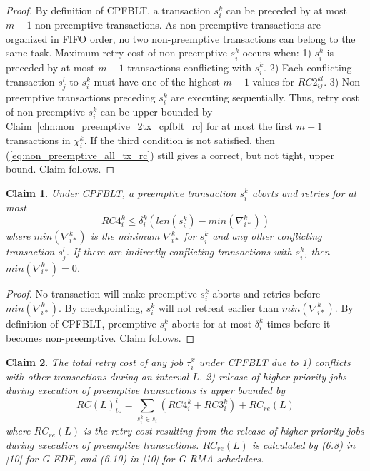 \documentclass[conference]{IEEEtran}
\newtheorem{clm}{Claim}
\begin{document}
%
\begin{proof}
By definition of CPFBLT, a transaction $s_i^k$ can be preceded by at most $m-1$ non-preemptive transactions. As non-preemptive transactions are organized in FIFO order, no two non-preemptive transactions can belong to the same task. Maximum retry cost of non-preemptive $s_i^k$ occurs when: 1) $s_i^k$ is preceded by at most $m-1$ transactions conflicting with $s_i^k$. 2) Each conflicting transaction $s_j^l$ to $s_i^k$ must have one of the highest $m-1$ values for $RC2_{ij}^{kl}$. 3) Non-preemptive transactions preceding $s_i^k$ are executing sequentially. Thus, retry cost of non-preemptive $s_i^k$ can be upper bounded by Claim~\ref{clm:non_preemptive_2tx_cpfblt_rc} for at most the first $m-1$ transactions in $\chi_i^k$. If the third condition is not satisfied, then (\ref{eq:non_preemptive_all_tx_rc}) still gives a correct, but not tight, upper bound. Claim follows.
\end{proof}
%
\begin{clm}\label{clm:delta_ik_rc}
%
Under CPFBLT, a preemptive transaction $s_i^k$ aborts and retries for at most
\begin{equation}
RC4_i^k \le \delta_i^k \left(len\left(s_i^k\right)-min\left(\nabla_{i*}^k\right)\right)
\label{eq:delta_ik_rc}
\end{equation}
%
where $min\left(\nabla_{i*}^k\right)$ is the minimum $\nabla_{i*}^k$ for $s_i^k$ and any other conflicting transaction $s_j^l$. If there are indirectly conflicting transactions with $s_i^k$, then $min\left(\nabla_{i*}^k\right)=0$.
%
\end{clm}
%
\begin{proof}
%
No transaction will make preemptive $s_i^k$ aborts and retries before $min\left(\nabla_{i*}^k\right)$. By checkpointing, $s_i^k$ will not retreat earlier than $min\left(\nabla_{i*}^k\right)$. By definition of CPFBLT, preemptive $s_i^k$ aborts for at most $\delta_i^k$ times before it becomes non-preemptive. Claim follows.
\end{proof}
%
\begin{clm}\label{clm:closed_nested_fblt_final}
%
The total retry cost of any job $\tau_i^x$ under CPFBLT due to 1) conflicts with other transactions during an interval $L$. 2) release of higher priority jobs during execution of preemptive transactions is upper bounded by
%
\begin{equation}
RC(L)_{to}^i=\sum_{s_i^k \in s_i} \left(RC4_i^k + RC3_i^k \right) + RC_{re}(L)
\label{eq:cpfblt_final}
\end{equation}
where $RC_{re}(L)$ is the retry cost resulting from the release of higher priority jobs during execution of preemptive transactions. $RC_{re}(L)$ is calculated by (6.8) in [10] for G-EDF, and (6.10) in [10] for G-RMA schedulers.
%
\end{clm}
\end{document}
